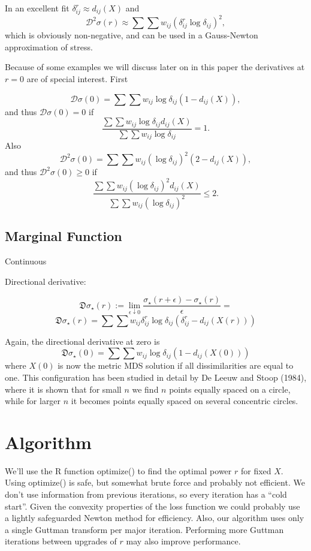 \documentclass[
  12pt,
]{article}
\begin{document}
In an excellent fit \(\delta_{ij}^r\approx d_{ij}(X)\) and
\begin{equation}
\mathcal{D}^2\sigma(r)\approx\sum\sum w_{ij}(\delta_{ij}^r\log\delta_{ij})^2,
\label{eq:excellent}
\end{equation}
which is obviously non-negative, and can be used in a Gauss-Newton approximation
of stress.

Because of some examples we will discuss later on in this paper the derivatives
at \(r=0\) are of special interest. First

\[
\mathcal{D}\sigma(0)=\sum\sum w_{ij}\log\delta_{ij}(1-d_{ij}(X)),
\]
and thus \(\mathcal{D}\sigma(0)=0\) if
\[
\frac{\sum\sum w_{ij}\log\delta_{ij}d_{ij}(X)}{\sum\sum w_{ij}\log\delta_{ij}}=1.
\]
Also
\[
\mathcal{D}^2\sigma(0)=\sum\sum w_{ij}(\log\delta_{ij})^2(2-d_{ij}(X)),
\]
and thus \(\mathcal{D}^2\sigma(0)\geq 0\) if
\[
\frac{\sum\sum w_{ij}(\log\delta_{ij})^2d_{ij}(X)}{\sum\sum w_{ij}(\log\delta_{ij})^2}\leq 2.
\]

\subsection{Marginal Function}\label{marginal-function}

Continuous

Directional derivative:

\[
\mathfrak{D}\sigma_\star(r):=\lim_{\epsilon\downarrow 0}\frac{\sigma_\star(r+\epsilon)-\sigma_\star(r)}{\epsilon}=
\]
\[
\mathfrak{D}\sigma_\star(r)=\sum\sum w_{ij}\delta_{ij}^r\log\delta_{ij}(\delta_{ij}^r-d_{ij}(X(r)))
\]

Again, the directional derivative at zero is
\[
\mathfrak{D}\sigma_\star(0)=\sum\sum w_{ij}\log\delta_{ij}(1-d_{ij}(X(0)))
\]
where \(X(0)\) is now the metric MDS solution if all dissimilarities are equal to one. This configuration has been studied in detail by De Leeuw and Stoop (1984), where it is shown that for small \(n\) we find \(n\) points equally spaced on a circle, while for larger \(n\) it becomes points equally spaced on several concentric circles.

\section{Algorithm}\label{algorithm}

We'll use the R function optimize() to find the
optimal power \(r\) for fixed \(X\). Using optimize() is safe, but somewhat brute force and probably not efficient. We don't use information from previous
iterations, so every iteration has a ``cold start''. Given the convexity
properties of the loss function we could probably
use a lightly safeguarded Newton method for efficiency. Also, our algorithm uses only a single Guttman transform per major iteration. Performing more Guttman iterations between upgrades of \(r\) may also improve performance.
\end{document}
